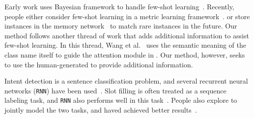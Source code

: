 Early work uses Bayesian framework to handle few-shot learning~\cite{fei2006one}. Recently, people either consider few-shot learning in a metric learning framework~\cite{koch2015siamese,vinyals2016matching}. or store instances in the memory network~\cite{santoro2016meta, kaiser2017learning} to match rare instances in the future.
Our method follows another thread of work that adds additional information to assist few-shot learning.
In this thread, Wang et al.~ uses the semantic meaning of the class name itself to guide the attention module in \NN. 
Our method, however, seeks to use the human-generated \RE to provide additional information.

Intent detection is a sentence classification problem, and several recurrent neural networks (\texttt{RNN}) have been used~\cite{ravuri2015comparative}.
Slot filling is often treated as a sequence labeling task, and \texttt{RNN} also performs well in this task~\cite{mesnil2015using}. 
People also explore to jointly model the two tasks, and haved achieved better results~\cite{liu2016attention, zhang2016joint}.



